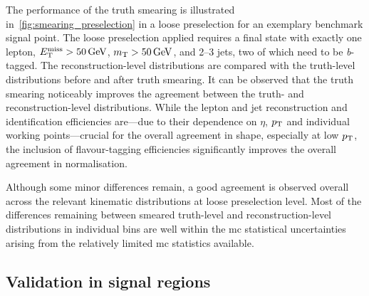  The performance of the truth smearing is illustrated in~\cref{fig:smearing_preselection} in a loose preselection for an exemplary benchmark signal point.
 The loose preselection applied requires a final state with exactly one lepton, $\met>\SI{50}{\GeV}$, $\mt > \SI{50}{\GeV}$, and 2--3 jets, two of which need to be \textit{b}-tagged.
 The reconstruction-level distributions are compared with the truth-level distributions before and after truth smearing. It can be observed that the truth smearing noticeably improves the agreement between the truth- and reconstruction-level distributions.
 While the lepton and jet reconstruction and identification efficiencies are---due to their dependence on $\eta$, $p_{\textrm{T}}$ and individual working points---crucial for the overall agreement in shape, especially at low $p_{\textrm{T}}$, the inclusion of flavour-tagging efficiencies significantly improves the overall agreement in normalisation.
 
Although some minor differences remain, a good agreement is observed overall across the relevant kinematic distributions at loose preselection level.
Most of the differences remaining between smeared truth-level and reconstruction-level distributions in individual bins are well within the \gls{mc} statistical uncertainties arising from the relatively limited \gls{mc} statistics available.
 
 \subsection{Validation in signal regions}

